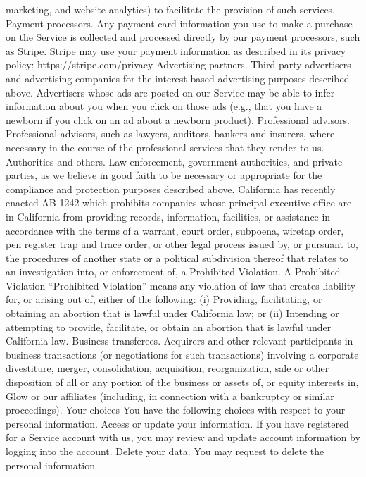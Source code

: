 marketing, and website analytics) to facilitate the provision of such
services.
Payment processors. Any payment card information you use to make a
purchase on the Service is collected and processed directly by our
payment processors, such as Stripe. Stripe may use your payment
information as described in its privacy policy: https://stripe.com/privacy
Advertising partners. Third party advertisers and advertising
companies for the interest-based advertising purposes described above.
Advertisers whose ads are posted on our Service may be able to infer
information about you when you click on those ads (e.g., that you have a
newborn if you click on an ad about a newborn product).
Professional advisors. Professional advisors, such as lawyers, auditors,
bankers and insurers, where necessary in the course of the professional
services that they render to us.
Authorities and others. Law enforcement, government authorities, and
private parties, as we believe in good faith to be necessary or
appropriate for the compliance and protection purposes described
above. California has recently enacted AB 1242 which prohibits
companies whose principal executive office are in California from
providing records, information, facilities, or assistance in accordance
with the terms of a warrant, court order, subpoena, wiretap order, pen
register trap and trace order, or other legal process issued by, or
pursuant to, the procedures of another state or a political subdivision
thereof that relates to an investigation into, or enforcement of, a
Prohibited Violation. A Prohibited Violation “Prohibited Violation” means
any violation of law that creates liability for, or arising out of, either of
the following: (i) Providing, facilitating, or obtaining an abortion that is
lawful under California law; or (ii) Intending or attempting to provide,
facilitate, or obtain an abortion that is lawful under California law.
Business transferees. Acquirers and other relevant participants in
business transactions (or negotiations for such transactions) involving a
corporate divestiture, merger, consolidation, acquisition, reorganization,
sale or other disposition of all or any portion of the business or assets
of, or equity interests in, Glow or our affiliates (including, in connection
with a bankruptcy or similar proceedings).
Your choices
You have the following choices with respect to your personal
information.
Access or update your information. If you have registered for a Service
account with us, you may review and update account information by
logging into the account.
Delete your data. You may request to delete the personal information
